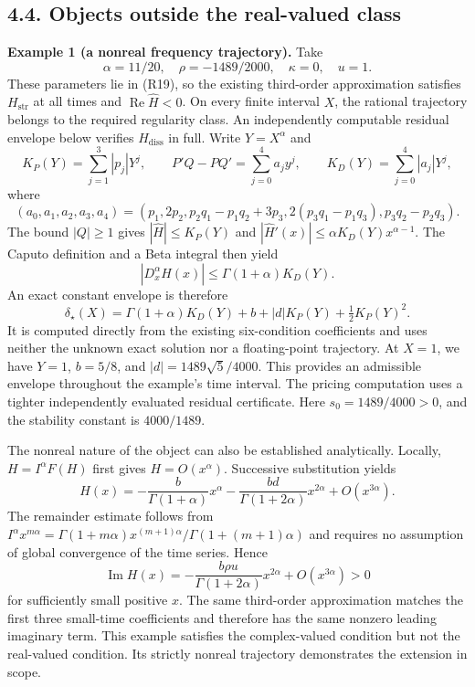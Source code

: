 \documentclass[a4paper,11pt]{article}
\begin{document}
\subsection*{4.4. Objects outside the real-valued class}

\textbf{Example 1 (a nonreal frequency trajectory).} Take
\[
\alpha=11/20,\quad\rho=-1489/2000,\quad\kappa=0,\quad u=1.
\tag{R20}
\]
These parameters lie in (R19), so the existing third-order approximation satisfies \(H_{\mathrm{str}}\) at all times and \(\operatorname{Re}\widehat H<0\). On every finite interval \(X\), the rational trajectory belongs to the required regularity class. An independently computable residual envelope below verifies \(H_{\mathrm{diss}}\) in full. Write \(Y=X^\alpha\) and
\[
K_P(Y)=\sum_{j=1}^3|p_j|Y^j,\qquad
P'Q-PQ'=\sum_{j=0}^4a_jy^j,\qquad
K_D(Y)=\sum_{j=0}^4|a_j|Y^j,
\]
where
\[
(a_0,a_1,a_2,a_3,a_4)=
(p_1,2p_2,p_2q_1-p_1q_2+3p_3,
2(p_3q_1-p_1q_3),p_3q_2-p_2q_3).
\]
The bound \(|Q|\ge1\) gives \(|\widehat H|\le K_P(Y)\) and
\(|\widehat H'(x)|\le\alpha K_D(Y)x^{\alpha-1}\). The Caputo definition and a Beta integral then yield
\[
|D_x^\alpha\widehat H(x)|\le\Gamma(1+\alpha)K_D(Y).
\]
An exact constant envelope is therefore
\[
\delta_\star(X)=\Gamma(1+\alpha)K_D(Y)+b+|d|K_P(Y)
+\tfrac12K_P(Y)^2.
\tag{R20a}
\]
It is computed directly from the existing six-condition coefficients and uses neither the unknown exact solution nor a floating-point trajectory. At \(X=1\), we have \(Y=1\), \(b=5/8\), and \(|d|=1489\sqrt5/4000\). This provides an admissible envelope throughout the example's time interval. The pricing computation uses a tighter independently evaluated residual certificate. Here \(s_0=1489/4000>0\), and the stability constant is \(4000/1489\).

The nonreal nature of the object can also be established analytically. Locally, \(H=I^\alpha F(H)\) first gives \(H=O(x^\alpha)\). Successive substitution yields
\[
H(x)=-\frac{b}{\Gamma(1+\alpha)}x^\alpha
-\frac{bd}{\Gamma(1+2\alpha)}x^{2\alpha}
+O(x^{3\alpha}).
\tag{R21}
\]
The remainder estimate follows from \(I^\alpha x^{m\alpha}=\Gamma(1+m\alpha)x^{(m+1)\alpha}/\Gamma(1+(m+1)\alpha)\) and requires no assumption of global convergence of the time series. Hence
\[
\operatorname{Im}H(x)=-\frac{b\rho u}{\Gamma(1+2\alpha)}x^{2\alpha}
+O(x^{3\alpha})>0
\]
for sufficiently small positive \(x\). The same third-order approximation matches the first three small-time coefficients and therefore has the same nonzero leading imaginary term. This example satisfies the complex-valued condition but not the real-valued condition. Its strictly nonreal trajectory demonstrates the extension in scope.
\end{document}
